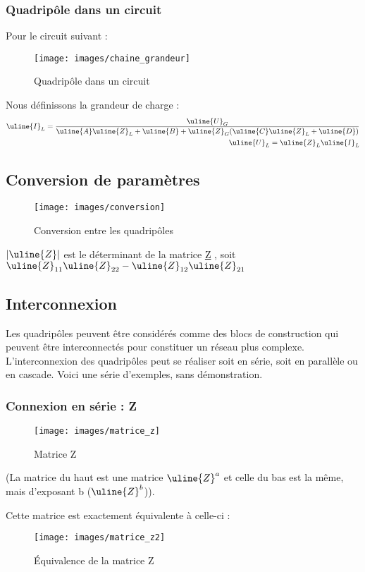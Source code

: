 \documentclass[12pt,a4paper]{article}
\newcommand{\uz}{\uline{Z} }
\newcommand{\ui}{\uline{I} }
\newcommand{\uu}{\uline{U} }
\newcommand{\ua}{\uline{A} }
\newcommand{\ub}{\uline{B} }
\newcommand{\uc}{\uline{C} }
\newcommand{\ud}{\uline{D} }
\begin{document}
\subsubsection{Quadripôle dans un circuit}
Pour le circuit suivant :
\begin{figure}[!h]
	\centering
	\texttt{[image: images/chaine\_grandeur]}
	\caption{Quadripôle dans un circuit}
\end{figure}

Nous définissons la grandeur de charge :
\begin{align}
\ui_L = \frac{\uu_G}{\ua\uz_L +  \ub + \uz_G(\uc\uz_L + \ud)}\\
\uu_L = \uz_L\ui_L
\end{align}
\subsection[Conversion de paramètres des quadripôles]{Conversion de paramètres}
\begin{figure}[!h]
	\centering
	\texttt{[image: images/conversion]}
	\caption{Conversion entre les quadripôles}
\end{figure}
\begin{blackbox}
	 $|\uz|$ est le déterminant de la matrice \uz, soit $\uz_{11}\uz_{22} - \uz_{12}\uz_{21}$
\end{blackbox}
\subsection[Interconnexion des quadripôles]{Interconnexion}
Les quadripôles peuvent être considérés comme des blocs de construction qui peuvent être interconnectés pour constituer un réseau plus complexe. L’interconnexion des quadripôles peut se réaliser soit en série, soit en parallèle ou en cascade. Voici une série d'exemples, sans démonstration.

\subsubsection{Connexion en série : Z}
\begin{figure}[!h]
	\centering
	\texttt{[image: images/matrice\_z]}
	\caption{Matrice Z}
\end{figure}
(La matrice du haut est une matrice $\uz^a$ et celle du bas est la même, mais d'exposant b ($\uz^b$)). 

Cette matrice est exactement équivalente à celle-ci :
\begin{figure}[!h]
	\centering
	\texttt{[image: images/matrice\_z2]}
	\caption{Équivalence de la matrice Z}
\end{figure}
\end{document}
